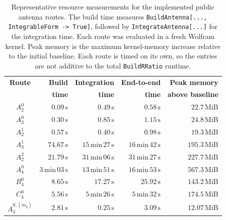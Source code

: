 \begin{table}[h!]
    \centering
\caption{\centering Representative resource measurements for the implemented public
    antenna routes. The build time measures
    \texttt{BuildAntenna[..., IntegrableForm -> True]}, followed by
    \texttt{IntegrateAntenna[...]} for the integration time. Each route was
    evaluated in a fresh Wolfram kernel. Peak memory is the maximum kernel-memory
    increase relative to the initial baseline. Each route is timed on its own, so the entries are not additive to the total \texttt{BuildRRatio} runtime.}
    \footnotesize
    \renewcommand{\arraystretch}{1.15}
    \begin{tabular}{|c|r|r|r|r|}
        \hline
        \textbf{Route} &
        \textbf{Build} &
        \textbf{Integration} &
        \textbf{End-to-end} &
        \textbf{Peak memory} \\
        &
        \textbf{time} &
        \textbf{time} &
        \textbf{time} &
        \textbf{above baseline} \\
        \hline
        $A_2^0$ & $0.09\,\mathrm{s}$ & $0.49\,\mathrm{s}$ & $0.58\,\mathrm{s}$ & $22.7\,\mathrm{MiB}$ \\
        $A_3^0$ & $0.30\,\mathrm{s}$ & $0.85\,\mathrm{s}$ & $1.15\,\mathrm{s}$ & $24.8\,\mathrm{MiB}$ \\
        $A_2^1$ & $0.57\,\mathrm{s}$ & $0.40\,\mathrm{s}$ & $0.98\,\mathrm{s}$ & $19.3\,\mathrm{MiB}$ \\
        $A_3^1$ & $74.67\,\mathrm{s}$ & $15\,\mathrm{min}\,27\,\mathrm{s}$ & $16\,\mathrm{min}\,42\,\mathrm{s}$ & $195.3\,\mathrm{MiB}$ \\
        $A_2^2$ & $21.79\,\mathrm{s}$ & $31\,\mathrm{min}\,06\,\mathrm{s}$ & $31\,\mathrm{min}\,27\,\mathrm{s}$ & $227.7\,\mathrm{MiB}$ \\
        $A_4^0$ & $3\,\mathrm{min}\,03\,\mathrm{s}$ & $13\,\mathrm{min}\,51\,\mathrm{s}$ & $16\,\mathrm{min}\,53\,\mathrm{s}$ & $567.3\,\mathrm{MiB}$ \\
        $B_4^0$ & $8.65\,\mathrm{s}$ & $17.27\,\mathrm{s}$ & $25.92\,\mathrm{s}$ & $143.2\,\mathrm{MiB}$ \\
        $C_4^0$ & $5.56\,\mathrm{s}$ & $5\,\mathrm{min}\,26\,\mathrm{s}$ & $5\,\mathrm{min}\,32\,\mathrm{s}$ & $174.5\,\mathrm{MiB}$ \\
        $A_3^{0,(m_q)}$ & $2.81\,\mathrm{s}$ & $0.25\,\mathrm{s}$ & $3.09\,\mathrm{s}$ & $12.07\,\mathrm{MiB}$ \\
        \hline
    \end{tabular}
    
    \label{tab:runtimeBenchmarks}
\end{table}